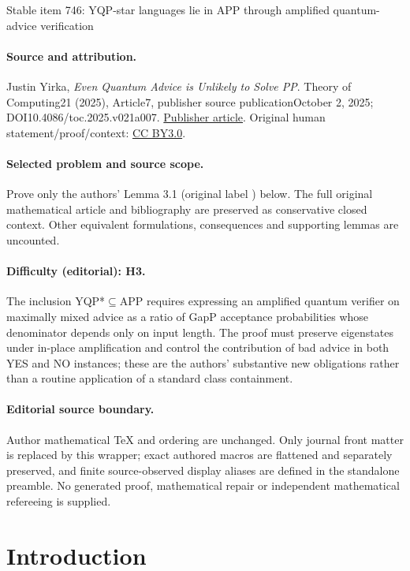 \documentclass[11pt]{article}
\numberwithin{equation}{section}
\theoremstyle{definition}
\theoremstyle{plain}
\begin{document}
\begin{center}{\Large Stable item 746: YQP-star languages lie in APP through amplified quantum-advice verification}\end{center}
\paragraph{Source and attribution.}
Justin Yirka, \emph{Even Quantum Advice is Unlikely to Solve PP}. Theory of Computing21 (2025), Article7, publisher source publicationOctober 2, 2025; DOI10.4086/toc.2025.v021a007. \href{https://theoryofcomputing.org/articles/v021a007/}{Publisher article}. Original human statement/proof/context: \href{https://creativecommons.org/licenses/by/3.0/}{CC BY3.0}.
\paragraph{Selected problem and source scope.}
Prove only the authors' Lemma 3.1 (original label ) below. The full original mathematical article and bibliography are preserved as conservative closed context. Other equivalent formulations, consequences and supporting lemmas are uncounted.
\paragraph{Difficulty (editorial): H3.}
The inclusion YQP*\(\subseteq\)APP requires expressing an amplified quantum verifier on maximally mixed advice as a ratio of GapP acceptance probabilities whose denominator depends only on input length. The proof must preserve eigenstates under in-place amplification and control the contribution of bad advice in both YES and NO instances; these are the authors’ substantive new obligations rather than a routine application of a standard class containment.
\paragraph{Editorial source boundary.}
Author mathematical TeX and ordering are unchanged. Only journal front matter is replaced by this wrapper; exact authored macros are flattened and separately preserved, and finite source-observed display aliases are defined in the standalone preamble. No generated proof, mathematical repair or independent mathematical refereeing is supplied.
\clearpage

%
%
%

%
%

%
\section{Introduction}
\end{document}
